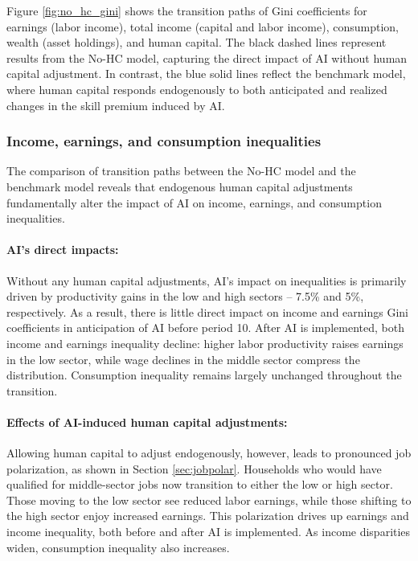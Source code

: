 \documentclass[12pt]{article}
\begin{document}
Figure \ref{fig:no_hc_gini} shows the transition paths of Gini coefficients for earnings (labor income), total income (capital and labor income), consumption, wealth (asset holdings), and human capital. The black dashed lines represent results from the No-HC model, capturing the direct impact of AI without human capital adjustment. In contrast, the blue solid lines reflect the benchmark model, where human capital responds endogenously to both anticipated and realized changes in the skill premium induced by AI.

\subsubsection{Income, earnings, and consumption inequalities}
The comparison of transition paths between the No-HC model and the benchmark model reveals that endogenous human capital adjustments fundamentally alter the impact of AI on income, earnings, and consumption inequalities.

\paragraph{AI's direct impacts:} Without any human capital adjustments, AI's impact on inequalities is primarily driven by productivity gains in the low and high sectors -- 7.5\% and 5\%, respectively. As a result, there is little direct impact on income and earnings Gini coefficients in anticipation of AI before period 10. After AI is implemented, both income and earnings inequality decline: higher labor productivity raises earnings in the low sector, while wage declines in the middle sector compress the distribution. Consumption inequality remains largely unchanged throughout the transition.

\paragraph{Effects of AI-induced human capital adjustments:}
Allowing human capital to adjust endogenously, however, leads to pronounced job polarization, as shown in Section \ref{sec:jobpolar}. Households who would have qualified for middle-sector jobs now transition to either the low or high sector. Those moving to the low sector see reduced labor earnings, while those shifting to the high sector enjoy increased earnings. This polarization drives up earnings and income inequality, both before and after AI is implemented. As income disparities widen, consumption inequality also increases.
\end{document}
